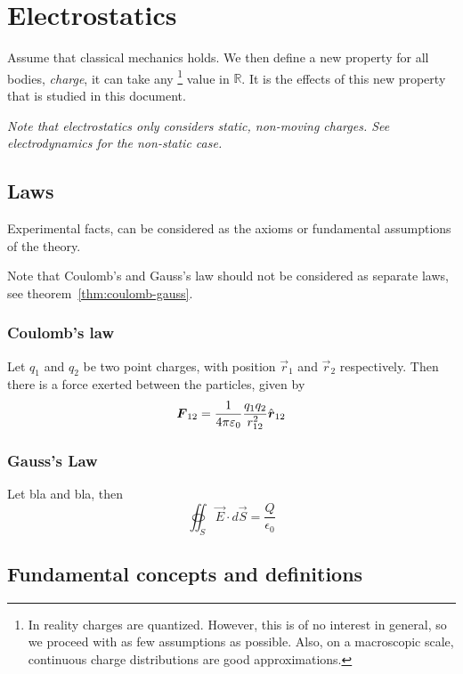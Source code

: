 \chapter{Electrostatics}

Assume that classical mechanics holds. We then define a new property
for all bodies, \emph{charge}, it can take any
\footnote{In reality charges are quantized. However, this is of no
  interest in general, so we proceed with as few assumptions as
  possible. Also, on a macroscopic scale, continuous charge
  distributions are good approximations.}
value in $\mathbb{R}$. It is the effects of this new property that is
studied in this document.

\emph{Note that electrostatics only considers static, non-moving
  charges. See electrodynamics for the non-static case.}




\section{Laws}

Experimental facts, can be considered as the axioms or fundamental
assumptions of the theory.

Note that Coulomb's and Gauss's law should not be considered as
separate laws, see theorem~\ref{thm:coulomb-gauss}.


\subsection{Coulomb's law}

Let $q_1$ and $q_2$ be two point charges, with position $\vec{r}_1$
and $\vec{r}_2$ respectively. Then there is a force exerted between
the particles, given by
\begin{equation*}
  \boldsymbol{F}_{12} = \frac{1}{4\pi\varepsilon_0}\frac{q_1q_2}{r_{12}^2}\hat{\boldsymbol{r}}_\text{12}
\end{equation*}


\subsection{Gauss's Law}

Let bla and bla, then
\begin{equation*}
  \oiint_S \vec{E} \cdot d\vec{S} = \frac{Q}{\epsilon_0}
\end{equation*}




\section{Fundamental concepts and definitions}

